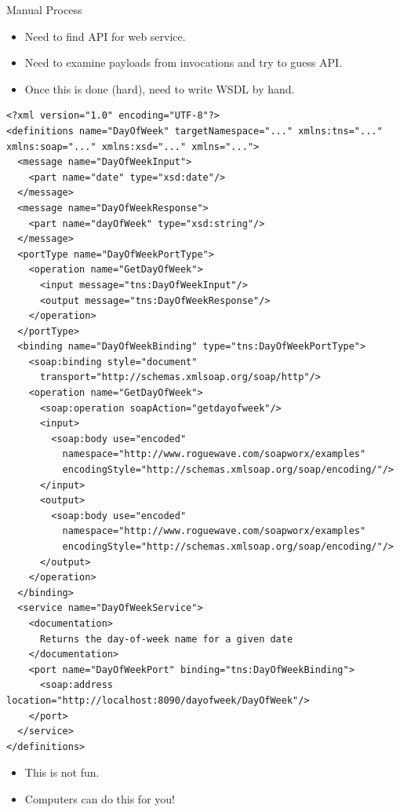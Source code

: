\documentclass{beamer}
\begin{document}
\begin{frame}{Manual Process}
    \begin{itemize}
        \item Need to find API for web service.
        \item Need to examine payloads from invocations and try to guess API.
        \item Once this is done (hard), need to write WSDL by hand.
    \end{itemize}
    \begin{lstlisting}
<?xml version="1.0" encoding="UTF-8"?>
<definitions name="DayOfWeek" targetNamespace="..." xmlns:tns="..." xmlns:soap="..." xmlns:xsd="..." xmlns="..."> 
  <message name="DayOfWeekInput">
    <part name="date" type="xsd:date"/>
  </message>
  <message name="DayOfWeekResponse">
    <part name="dayOfWeek" type="xsd:string"/>
  </message>
  <portType name="DayOfWeekPortType">
    <operation name="GetDayOfWeek">
      <input message="tns:DayOfWeekInput"/>
      <output message="tns:DayOfWeekResponse"/>
    </operation>
  </portType>
  <binding name="DayOfWeekBinding" type="tns:DayOfWeekPortType">
    <soap:binding style="document" 
      transport="http://schemas.xmlsoap.org/soap/http"/>
    <operation name="GetDayOfWeek">
      <soap:operation soapAction="getdayofweek"/>
      <input>
        <soap:body use="encoded" 
          namespace="http://www.roguewave.com/soapworx/examples" 
          encodingStyle="http://schemas.xmlsoap.org/soap/encoding/"/>
      </input>
      <output>
        <soap:body use="encoded" 
          namespace="http://www.roguewave.com/soapworx/examples"  
          encodingStyle="http://schemas.xmlsoap.org/soap/encoding/"/>
      </output>
    </operation>
  </binding>
  <service name="DayOfWeekService">
    <documentation>
      Returns the day-of-week name for a given date
    </documentation>
    <port name="DayOfWeekPort" binding="tns:DayOfWeekBinding">
      <soap:address location="http://localhost:8090/dayofweek/DayOfWeek"/>
    </port>
  </service>
</definitions>
    \end{lstlisting}
    \begin{itemize}
        \item This is not fun.
        \item Computers can do this for you!
    \end{itemize}
\end{frame}

\end{document}
